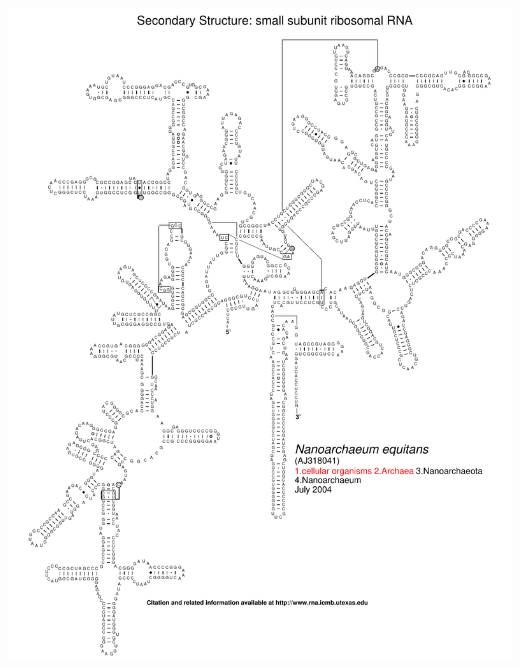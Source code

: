 \documentclass[landscape]{slides}
\begin{document}
\begin{slide}\begin{center}\includegraphics[height=8in]{figs/arc-13}\end{center}\vfill\end{slide}
\end{document}
